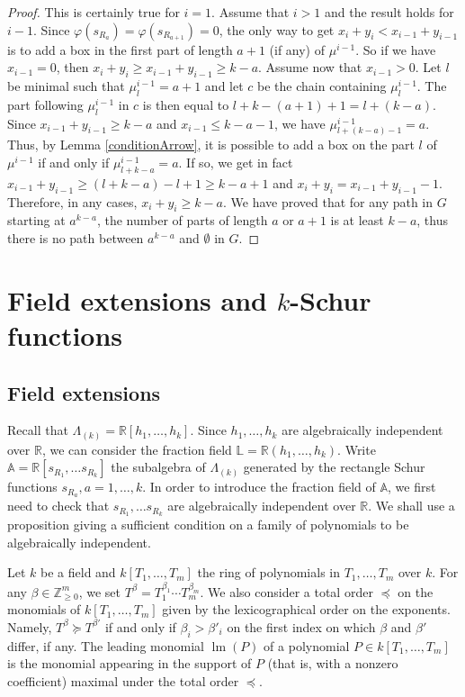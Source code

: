 \documentclass[10pt,a4paper]{amsart}
\theoremstyle{definition}
\DeclareMathOperator{\lm}{lm}
\begin{document}
\begin{proof}
\noindent This is certainly true for $i=1$. Assume that $i>1$ and the result
holds for $i-1$. Since $\varphi(s_{R_{a}})=\varphi(s_{R_{a+1}})=0$, the only
way to get $x_{i}+y_{i}<x_{i-1}+y_{i-1}$ is to add a box in the first part of
length $a+1$ (if any) of $\mu^{i-1}$. So if we have $x_{i-1}=0$, then
$x_{i}+y_{i}\geq x_{i-1}+y_{i-1}\geq k-a$. Assume now that $x_{i-1}>0$. Let
$l$ be minimal such that $\mu_{l}^{i-1}=a+1$ and let $c$ be the chain
containing $\mu_{l}^{i-1}$. The part following $\mu_{l}^{i-1}$ in $c$ is then
equal to $l+k-(a+1)+1=l+(k-a)$. Since $x_{i-1}+y_{i-1}\geq k-a$ and
$x_{i-1}\leq k-a-1$, we have $\mu_{l+(k-a)-1}^{i-1}=a$. Thus, by Lemma
\ref{conditionArrow}, it is possible to add a box on the part $l$ of
$\mu^{i-1}$ if and only if $\mu_{l+k-a}^{i-1}=a.$ If so, we get in fact
$x_{i-1}+y_{i-1}\geq(l+k-a)-l+1\geq k-a+1$ and $x_{i}+y_{i}=x_{i-1}+y_{i-1}%
-1$. Therefore, in any cases, $x_{i}+y_{i}\geq k-a$. We have proved that for
any path in $G$ starting at $a^{k-a}$, the number of parts of length $a$ or
$a+1$ is at least $k-a$, thus there is no path between $a^{k-a}$ and
$\emptyset$ in $G$.
\end{proof}

\section{Field extensions and \texorpdfstring{$k$}{k}-Schur functions}\label{section4}

\label{Secion_Field}

\subsection{Field extensions}

Recall that $\Lambda_{(k)}\mathbb{=R}[h_{1},\ldots,h_{k}]$. Since
$h_{1},\ldots,h_{k}$ are algebraically independent over $\mathbb{R}$, we can
consider the fraction field $\mathbb{L}=\mathbb{R}(h_{1},\ldots,h_{k}%
)$. Write $\mathbb{A}=\mathbb{R}[s_{R_{1}},\ldots s_{R_{k}}]$ the subalgebra
of $\Lambda_{(k)}$ generated by the rectangle Schur functions $s_{R_{a}%
},a=1,\ldots,k$. In order to introduce the fraction field of $\mathbb{A}$, we
first need to check that $s_{R_{1}},\ldots s_{R_{k}}$ are algebraically
independent over $\mathbb{R}$. We shall use a proposition giving a sufficient
condition on a family of polynomials to be algebraically independent.

Let $k$ be a field and $k[T_{1},\ldots,T_{m}]$ the ring of polynomials in
$T_{1},\ldots,T_{m}$ over $k$. For any $\beta\in\mathbb{Z}_{\geq0}^{m}$, we
set $T^{\beta}=T_{1}^{\beta_{1}}\cdots T_{m}^{\beta_{m}}$. We also consider a total order $\preceq$ on the monomials of $k[T_{1},\ldots,T_{m}]$ given by the lexicographical order on the exponents. Namely, $T^{\beta}\succeq T^{\beta'}$ if and only if $\beta_{i}> \beta'_{i}$ on the first index on which $\beta$ and $\beta'$ differ, if any. The
leading monomial $\lm (P)$ of a polynomial $P\in k[T_{1},\ldots,T_{m}]$
is the monomial appearing in the support of $P$ (that is, with a nonzero
coefficient) maximal under the total order $\preceq$.
\end{document}
